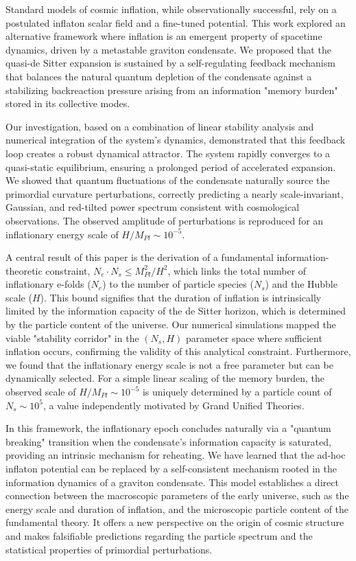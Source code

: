 \documentclass[]{article}
\begin{document}
Standard models of cosmic inflation, while observationally successful, rely on a postulated inflaton scalar field and a fine-tuned potential. This work explored an alternative framework where inflation is an emergent property of spacetime dynamics, driven by a metastable graviton condensate. We proposed that the quasi-de Sitter expansion is sustained by a self-regulating feedback mechanism that balances the natural quantum depletion of the condensate against a stabilizing backreaction pressure arising from an information "memory burden" stored in its collective modes.

Our investigation, based on a combination of linear stability analysis and numerical integration of the system's dynamics, demonstrated that this feedback loop creates a robust dynamical attractor. The system rapidly converges to a quasi-static equilibrium, ensuring a prolonged period of accelerated expansion. We showed that quantum fluctuations of the condensate naturally source the primordial curvature perturbations, correctly predicting a nearly scale-invariant, Gaussian, and red-tilted power spectrum consistent with cosmological observations. The observed amplitude of perturbations is reproduced for an inflationary energy scale of $H/M_{Pl} \sim 10^{-5}$.

A central result of this paper is the derivation of a fundamental information-theoretic constraint, $N_e \cdot N_s \leq M_{Pl}^2/H^2$, which links the total number of inflationary e-folds ($N_e$) to the number of particle species ($N_s$) and the Hubble scale ($H$). This bound signifies that the duration of inflation is intrinsically limited by the information capacity of the de Sitter horizon, which is determined by the particle content of the universe. Our numerical simulations mapped the viable "stability corridor" in the $(N_s, H)$ parameter space where sufficient inflation occurs, confirming the validity of this analytical constraint. Furthermore, we found that the inflationary energy scale is not a free parameter but can be dynamically selected. For a simple linear scaling of the memory burden, the observed scale of $H/M_{Pl} \sim 10^{-5}$ is uniquely determined by a particle count of $N_s \sim 10^5$, a value independently motivated by Grand Unified Theories.

In this framework, the inflationary epoch concludes naturally via a "quantum breaking" transition when the condensate's information capacity is saturated, providing an intrinsic mechanism for reheating. We have learned that the ad-hoc inflaton potential can be replaced by a self-consistent mechanism rooted in the information dynamics of a graviton condensate. This model establishes a direct connection between the macroscopic parameters of the early universe, such as the energy scale and duration of inflation, and the microscopic particle content of the fundamental theory. It offers a new perspective on the origin of cosmic structure and makes falsifiable predictions regarding the particle spectrum and the statistical properties of primordial perturbations.
\end{document}
